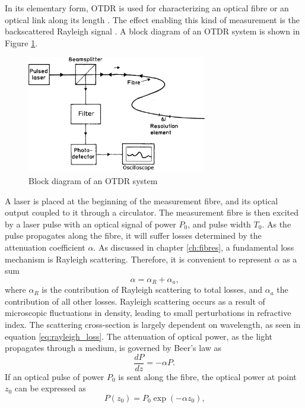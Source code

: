 \documentclass{standalone}
\begin{document}
In its elementary form, OTDR is used for characterizing an optical fibre or an optical link along its length \cite{UnderstandingOTDRs2000}. The effect enabling this kind of measurement is the backscattered Rayleigh signal \cite{epflBookRayleigh}. A block diagram of an OTDR system is shown in Figure \ref{fig:otdr_block}.
\begin{figure}[h]
	\centering
	\includegraphics[width=0.7\textwidth]{otdr_block.png}
	\caption{Block diagram of an OTDR system \cite{Rogers1999}}
	\label{fig:otdr_block}
\end{figure}
A laser is placed at the beginning of the measurement fibre, and its optical output coupled to it through a circulator. The measurement fibre is then excited by a laser pulse with an optical signal of power $P_0$, and pulse width $T_0$. As the pulse propagates along the fibre, it will suffer losses determined by the attenuation coefficient $\alpha$. As discussed in chapter \ref{ch:fibres}, a fundamental loss mechanism is Rayleigh scattering. Therefore, it is convenient to represent $\alpha$ as a sum \cite{agrawal}
\begin{equation}
\alpha = \alpha_R + \alpha_a \textrm{,}
\end{equation}
where $\alpha_R$ is the contribution of Rayleigh scattering to total losses, and $\alpha_a$ the contribution of all other losses. Rayleigh scattering occurs as a result of microscopic fluctuations in density, leading to small perturbations in refractive index. The scattering cross-section is largely dependent on wavelength, as seen in equation \ref{eq:rayleigh_loss}. The attenuation of optical power, as the light propagates through a medium, is governed by Beer's law as
\begin{equation}
\frac{dP}{dz} = -\alpha P \textrm{.}
\end{equation}
If an optical pulse of power $P_0$ is sent along the fibre, the optical power at point $z_0$ can be expressed as
\begin{equation}
P(z_0) = P_0 \exp\left(-\alpha z_0\right) \textrm{,}
\end{equation}
\end{document}
